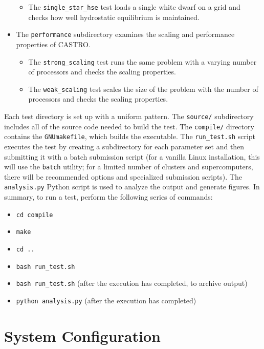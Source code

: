 \documentclass[12pt]{book}
\begin{document}
\begin{itemize}
\begin{itemize}
    \item The \texttt{single\_star\_hse} test loads a single white dwarf on a grid and checks how well 
hydrostatic equilibrium is maintained.
  \end{itemize}
  \item The \texttt{performance} subdirectory examines the scaling and performance properties of CASTRO.
  \begin{itemize}
    \item The \texttt{strong\_scaling} test runs the same problem with a varying number of processors and 
checks the scaling properties.
    \item The \texttt{weak\_scaling} test scales the size of the problem with the number of processors and
checks the scaling properties.
  \end{itemize}
\end{itemize}

Each test directory is set up with a uniform pattern. The \texttt{source/} subdirectory includes all of the source code
needed to build the test. The \texttt{compile/} directory contains the \texttt{GNUmakefile}, which builds the executable.
The \texttt{run\_test.sh} script executes the test by creating a subdirectory
for each parameter set and then submitting it with a batch submission script (for a vanilla Linux installation,
this will use the \texttt{batch} utility; for a limited number of clusters and supercomputers, 
there will be recommended options and specialized submission scripts). The \texttt{analysis.py} Python script
is used to analyze the output and generate figures. In summary, to run a test, perform the following series of commands:
\begin{itemize}
  \item \texttt{cd compile}
  \item \texttt{make}
  \item \texttt{cd ..}
  \item \texttt{bash run\_test.sh}
  \item \texttt{bash run\_test.sh} (after the execution has completed, to archive output)
  \item \texttt{python analysis.py} (after the execution has completed)
\end{itemize}



\chapter{System Configuration}
\end{document}
